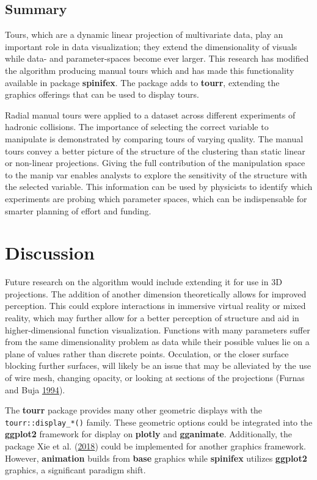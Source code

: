 \hypertarget{summary}{%
\subsection{Summary}\label{summary}}

Tours, which are a dynamic linear projection of multivariate data, play
an important role in data visualization; they extend the dimensionality
of visuals while data- and parameter-spaces become ever larger. This
research has modified the algorithm producing manual tours which and has
made this functionality available in package \textbf{spinifex}. The
package adds to \textbf{tourr}, extending the graphics offerings that
can be used to display tours.

Radial manual tours were applied to a dataset across different
experiments of hadronic collisions. The importance of selecting the
correct variable to manipulate is demonstrated by comparing tours of
varying quality. The manual tours convey a better picture of the
structure of the clustering than static linear or non-linear
projections. Giving the full contribution of the manipulation space to
the manip var enables analysts to explore the sensitivity of the
structure with the selected variable. This information can be used by
physicists to identify which experiments are probing which parameter
spaces, which can be indispensable for smarter planning of effort and
funding.

\hypertarget{sec:discussion}{%
\section{Discussion}\label{sec:discussion}}

Future research on the algorithm would include extending it for use in
3D projections. The addition of another dimension theoretically allows
for improved perception. This could explore interactions in immersive
virtual reality or mixed reality, which may further allow for a better
perception of structure and aid in higher-dimensional function
visualization. Functions with many parameters suffer from the same
dimensionality problem as data while their possible values lie on a
plane of values rather than discrete points. Occulation, or the closer
surface blocking further surfaces, will likely be an issue that may be
alleviated by the use of wire mesh, changing opacity, or looking at
sections of the projections (Furnas and Buja
\protect\hyperlink{ref-furnas_prosection_1994}{1994}).

The \textbf{tourr} package provides many other geometric displays with
the \texttt{tourr::display\_*()} family. These geometric options could
be integrated into the \textbf{ggplot2} framework for display on
\textbf{plotly} and \textbf{gganimate}. Additionally, the
 package Xie et al.
(\protect\hyperlink{ref-xie_animation:_2018}{2018}) could be implemented
for another graphics framework. However, \textbf{animation} builds from
\textbf{base} graphics while \textbf{spinifex} utilizes \textbf{ggplot2}
graphics, a significant paradigm shift.

